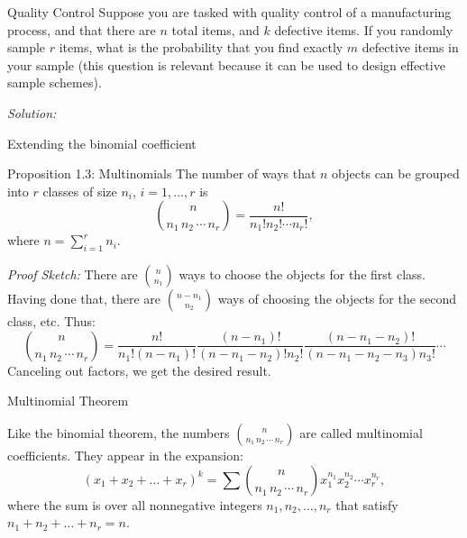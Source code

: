 \begin{frame}{Quality Control}
  Suppose you are tasked with quality control of a manufacturing process, and that there are $n$ total items, and $k$ defective items. If you randomly sample $r$ items, what is the probability that you find exactly $m$ defective items in your sample (this question is relevant because it can be used to design effective sample schemes).
  
  \emph{Solution:} 
  
  
\end{frame}

\begin{frame}{Extending the binomial coefficient}
  \begin{block}{Proposition 1.3: Multinomials}
    The number of ways that $n$ objects can be grouped into $r$ classes of size $n_i$,  $i = 1, \ldots, r$ is
    $$
    \binom{n}{n_1\,n_2\,\cdots\,n_r} = \frac{n!}{n_1!n_2!\cdots n_r!},
    $$
    where $n = \sum_{i = 1}^r n_i$.
  \end{block}
  
  \emph{Proof Sketch:} There are $\binom{n}{n_1}$ ways to choose the objects for the first class. Having done that, there are $\binom{n-n_1}{n_2}$ ways of choosing the objects for the second class, etc. Thus:
  $$
  \binom{n}{n_1\,n_2\,\cdots\,n_r} = \frac{n!}{n_1!(n - n_1)!}\frac{(n-n_1)!}{(n - n_1 - n_2)!n_2!}\frac{(n - n_1 - n_2)!}{(n-n_1-n_2-n_3)n_3!}\cdots
  $$
  Canceling out factors, we get the desired result. 

\end{frame}

\begin{frame}{Multinomial Theorem}

Like the binomial theorem, the numbers $\binom{n}{n_1\,n_2\,\cdots\,n_r}$ are called \alert{multinomial coefficients}. They appear in the expansion: 
$$
(x_1 + x_2 + \ldots + x_r)^k = \sum \binom{n}{n_1\, n_2\, \cdots\, n_r}x_1^{n_1}x_2^{n_2}\cdots x_{r}^{n_r},
$$
where the sum is over all nonnegative integers $n_1, n_2, \ldots, n_r$ that satisfy $n_1 + n_2 + \ldots + n_r = n$. 

\end{frame}

